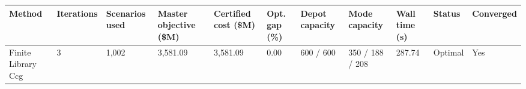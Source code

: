 \begin{tabular}{lllllllllll}
\toprule
Method & Iterations & Scenarios used & Master objective (\$M) & Certified cost (\$M) & Opt. gap (\%) & Depot capacity & Mode capacity & Wall time (s) & Status & Converged \\
\midrule
Finite Library Ccg & 3 & 1,002 & 3,581.09 & 3,581.09 & 0.00 & 600 / 600 & 350 / 188 / 208 & 287.74 & Optimal & Yes \\
\bottomrule
\end{tabular}
